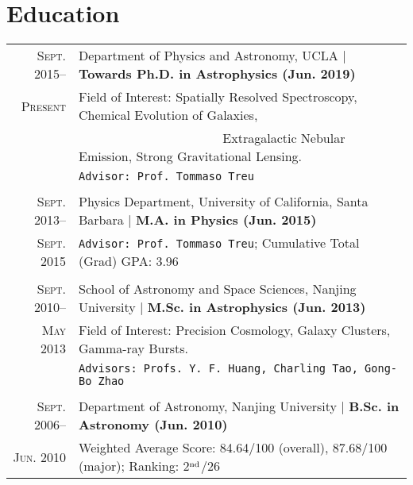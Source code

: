 \documentclass[letterpaper,10pt]{article}
\begin{document}
\section{Education}
\begin{tabular}{r|p{6.5in}}
  \textsc{Sept. 2015}--      &   Department of Physics and Astronomy, UCLA    |   \textbf{Towards Ph.D. in Astrophysics (Jun. 2019)}   \\
  \textsc{Present}
  & Field of Interest: Spatially Resolved Spectroscopy, Chemical Evolution of 
  Galaxies, \\ 
  & ~~~~~~~~~~~~~~~~~~~~~~ Extragalactic Nebular Emission, Strong Gravitational Lensing. \\
  &   \texttt{Advisor: Prof. Tommaso Treu}     \\
  \multicolumn{2}{c}{} \\
  \textsc{Sept. 2013}--      &   Physics Department, University of California, Santa Barbara    |   \textbf{M.A. in Physics (Jun. 2015)}   \\
  \textsc{Sept. 2015}
  &   \texttt{Advisor: Prof. Tommaso Treu}; \quad Cumulative Total (Grad) GPA: 3.96     \\
  \multicolumn{2}{c}{} \\
  \textsc{Sept. 2010}--     &   School of Astronomy and Space Sciences, Nanjing University  |  \textbf{M.Sc. in Astrophysics (Jun. 2013)}   \\
  \textsc{May 2013}
  & Field of Interest: Precision Cosmology, Galaxy Clusters, Gamma-ray Bursts. \\
  & \texttt{Advisors: Profs. Y. F. Huang, Charling Tao, Gong-Bo Zhao}   \\
  \multicolumn{2}{c}{} \\
  \textsc{Sept. 2006}--     &   Department of Astronomy, Nanjing University  |  \textbf{B.Sc. in Astronomy (Jun. 2010)}    \\
  \textsc{Jun. 2010}       &   Weighted Average Score: 84.64/100 (overall), 87.68/100 (major); Ranking: 2$^{\rm nd}$/26  \\
\end{tabular}

\vspace{1em}
\end{document}
